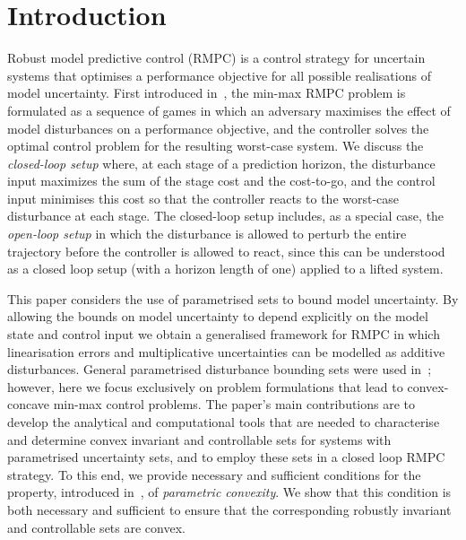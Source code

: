 \documentclass[journal]{IEEEtran}
\theoremstyle{remark}
\theoremstyle{definition}
\begin{document}
\def\genmat{\Xi} \def\genvec{\xi}

\section{Introduction}
% 
% 
% 
% 


Robust model predictive control (RMPC) is a control strategy for uncertain systems that optimises a 
performance objective for all possible realisations of model uncertainty.
%
First introduced in~\cite{Witsenhausen:1968}, the min-max RMPC problem is formulated as a sequence of games in which an adversary maximises the effect of model disturbances on a performance objective, and the controller solves the optimal
control problem for the resulting worst-case system.
%
We discuss the \emph{closed-loop setup} where, at each stage of a prediction horizon, the disturbance input maximizes the sum of the stage cost and the cost-to-go, and the control input minimises this cost so that the controller reacts to the worst-case disturbance at each stage.
%
The closed-loop setup includes, as a special case, the \emph{open-loop setup} in which the disturbance is allowed to perturb the 
entire trajectory before the controller is allowed to react, since this can be understood as a closed loop setup (with a horizon length of one) applied to a lifted system.
%

This paper considers the use of parametrised sets to bound model uncertainty. By allowing the bounds on model uncertainty to depend explicitly on the model state and control input we obtain a generalised framework for RMPC in which linearisation errors and multiplicative uncertainties can be modelled as additive disturbances.
%
General parametrised disturbance bounding sets were used in~\cite{Rakovic03,Rakovic06}; however, here we focus exclusively on problem formulations that lead to convex-concave min-max control problems.
% 
The paper's main contributions are to develop
the analytical and computational tools that are needed to characterise and determine convex invariant and controllable sets for systems with parametrised uncertainty sets, and to employ these sets in a closed loop RMPC strategy. To this end, we provide necessary and sufficient conditions for the property, introduced in~\cite{Schaich:CDC:2015}, of \emph{parametric convexity}. We show that this condition is both necessary and sufficient to ensure that the corresponding robustly invariant and controllable sets are convex.
\end{document}

